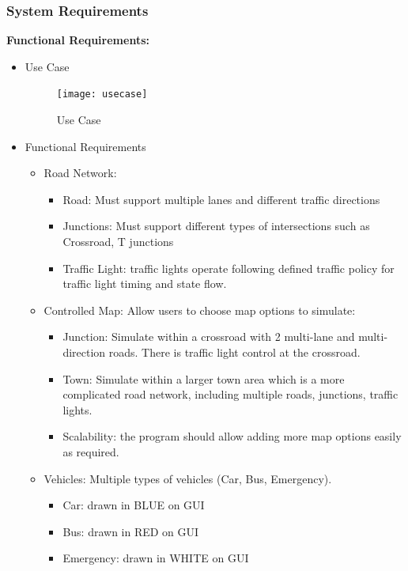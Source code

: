\documentclass[11pt]{article}
\begin{document}
{\subsubsection{System Requirements}

    {\bf{Functional Requirements:}} \newline
    \begin{itemize}
        \item Use Case
        \begin{figure}[h]
        \texttt{[image: usecase]} \caption{Use Case} \label{uc}
        \end{figure}
        \item Functional Requirements 
        \begin{itemize}
            \item Road Network:
                \begin{itemize}
                    \item Road: Must support multiple lanes and different traffic directions 
                    \item Junctions: Must support different types of intersections such as Crossroad, T junctions 
                    \item Traffic Light: traffic lights operate following  defined traffic policy for traffic light timing and state flow.
                    
                    
                    
                \end{itemize}
            \item Controlled Map: Allow users to choose map options to simulate:
                 \begin{itemize}[noitemsep]
	                    \item Junction: Simulate within a crossroad with 2 multi-lane and multi-direction roads. There is traffic light control at the crossroad.
	                    \item Town: Simulate within a larger town area which is a more complicated road network, including multiple roads, junctions, traffic lights. 
	                    \item Scalability: the program should allow adding more map options easily as required. 
                    	
	
    	\end{itemize}

        \item Vehicles: Multiple types of vehicles (Car, Bus, Emergency). 
            \begin{itemize}
                \item Car: drawn in BLUE on GUI
                \item Bus: drawn in RED on GUI
                \item Emergency: drawn in WHITE on GUI
            \end{itemize}
       

\end{itemize}
\end{itemize}}
\end{document}
